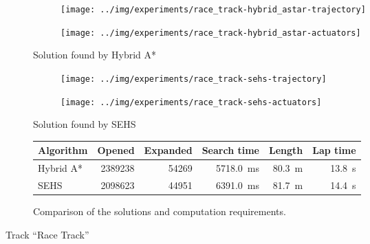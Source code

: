 \begin{figure}[!tbp]%
	\centering
	
	\begin{subfigure}[t]{\textwidth}
		\begin{subfigure}[c]{0.54\textwidth}
			\texttt{[image: ../img/experiments/race\_track-hybrid\_astar-trajectory]}
		\end{subfigure}
		\hfill
		\begin{subfigure}[c]{0.45\textwidth}
			\texttt{[image: ../img/experiments/race\_track-hybrid\_astar-actuators]}
		\end{subfigure}
		\caption{Solution found by Hybrid A*}
		\label{fig:race_track-hybrid_astar}
	\end{subfigure}
	
	\vspace{0.75cm}
	
	\begin{subfigure}[t]{\textwidth}	
		\begin{subfigure}[c]{0.54\textwidth}
			\texttt{[image: ../img/experiments/race\_track-sehs-trajectory]}
		\end{subfigure}
		\hfill
		\begin{subfigure}[c]{0.45\textwidth}
			\texttt{[image: ../img/experiments/race\_track-sehs-actuators]}
		\end{subfigure}
		\caption{Solution found by SEHS}
		\label{fig:race_track-sehs}
	\end{subfigure}
	
	\vspace{0.75cm}
	
	\begin{subfigure}[t]{\textwidth}
		\centering
		\begin{tabular}{l r r r r r}%
			\toprule
			Algorithm & Opened & Expanded & Search time & Length & Lap time \\
			\midrule
			Hybrid A* & \num{2389238} & \num{54269} & \bftab \SI{5718.0}{\milli\second} & \SI{80.3}{\meter} & \bftab \SI{13.8}{\second} \\
			\gls*{SEHS} & \bftab \num{2098623} & \bftab \num{44951} & \SI{6391.0}{\milli\second} & \SI{81.7}{\meter} & \SI{14.4}{\second} \\
			\bottomrule
		\end{tabular}
		\caption{Comparison of the solutions and computation requirements.}
		\label{table:race_track}
	\end{subfigure}
	
	\vspace{0.75cm}
	
	\caption{Track ``Race Track''}
	\label{fig:race_track}
\end{figure}

